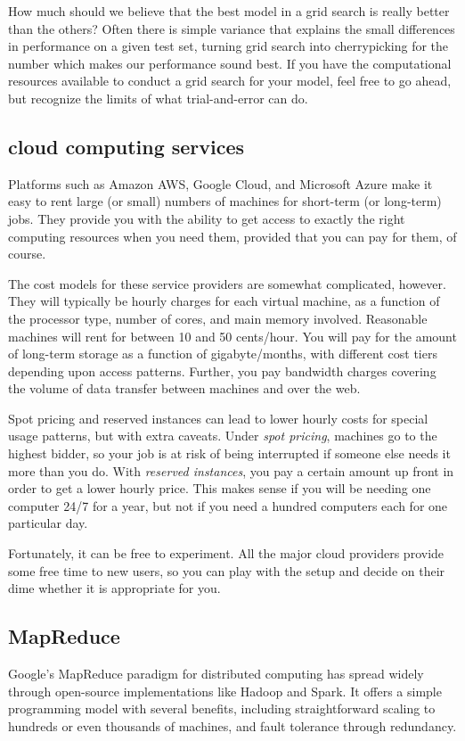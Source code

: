 \documentclass[10pt]{article}
\begin{document}
\begin{enumerate}
How much should we believe that the best model in a grid search is really better than the others? Often there is simple variance that explains the small differences in performance on a given test set, turning grid search into cherrypicking for the number which makes our performance sound best. If you have the computational resources available to conduct a grid search for your model, feel free to go ahead, but recognize the limits of what trial-and-error can do.

\subsection*{cloud computing services}
Platforms such as Amazon AWS, Google Cloud, and Microsoft Azure make it easy to rent large (or small) numbers of machines for short-term (or long-term) jobs. They provide you with the ability to get access to exactly the right computing resources when you need them, provided that you can pay for them, of course.

The cost models for these service providers are somewhat complicated, however. They will typically be hourly charges for each virtual machine, as a function of the processor type, number of cores, and main memory involved. Reasonable machines will rent for between 10 and 50 cents/hour. You will pay for the amount of long-term storage as a function of gigabyte/months, with different cost tiers depending upon access patterns. Further, you pay bandwidth charges covering the volume of data transfer between machines and over the web.

Spot pricing and reserved instances can lead to lower hourly costs for special usage patterns, but with extra caveats. Under \textit{spot pricing}, machines go to the highest bidder, so your job is at risk of being interrupted if someone else needs it more than you do. With \textit{reserved instances}, you pay a certain amount up front in order to get a lower hourly price. This makes sense if you will be needing one computer 24/7 for a year, but not if you need a hundred computers each for one particular day.

Fortunately, it can be free to experiment. All the major cloud providers provide some free time to new users, so you can play with the setup and decide on their dime whether it is appropriate for you.

\subsection*{MapReduce}
Google's MapReduce paradigm for distributed computing has spread widely through open-source implementations like Hadoop and Spark. It offers a simple programming model with several benefits, including straightforward scaling to hundreds or even thousands of machines, and fault tolerance through redundancy.


\end{enumerate}
\end{document}
